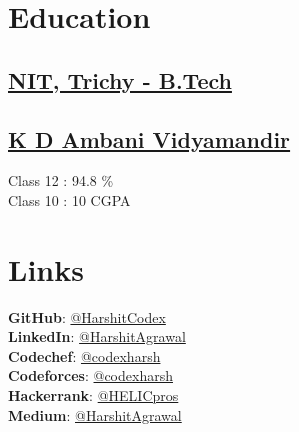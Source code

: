 \documentclass[]{deedy-resume-openfont}
\begin{document}

\begin{minipage}[t]{0.31\textwidth}

\section{Education} 

\subsection{\href{https://www.nitt.edu/}{NIT, Trichy - B.Tech}}

\sectionsep

\subsection{\href{https://www.rfs.edu.in/jamnagar/}{K D Ambani Vidyamandir}}
Class 12 : 94.8 \% \\
Class 10 : 10 CGPA\\

\section{Links}
\textbf{GitHub}: \href{https://github.com/HarshitCodex}{@HarshitCodex} \\
\textbf{LinkedIn}: \href{https://www.linkedin.com/in/harshitnitt/}{@HarshitAgrawal} \\
\textbf{Codechef}: \href{https://www.codechef.com/users/codexharsh}{@codexharsh} \\
\textbf{Codeforces}: \href{https://codeforces.com/profile/codexharsh}{@codexharsh} \\
\textbf{Hackerrank}: \href{https://www.hackerrank.com/HELICpros}{@HELICpros} \\
\textbf{Medium}: \href{https://harshitagrawal1971.medium.com/}{@HarshitAgrawal} \\
\sectionsep


\end{minipage}
\end{document}
